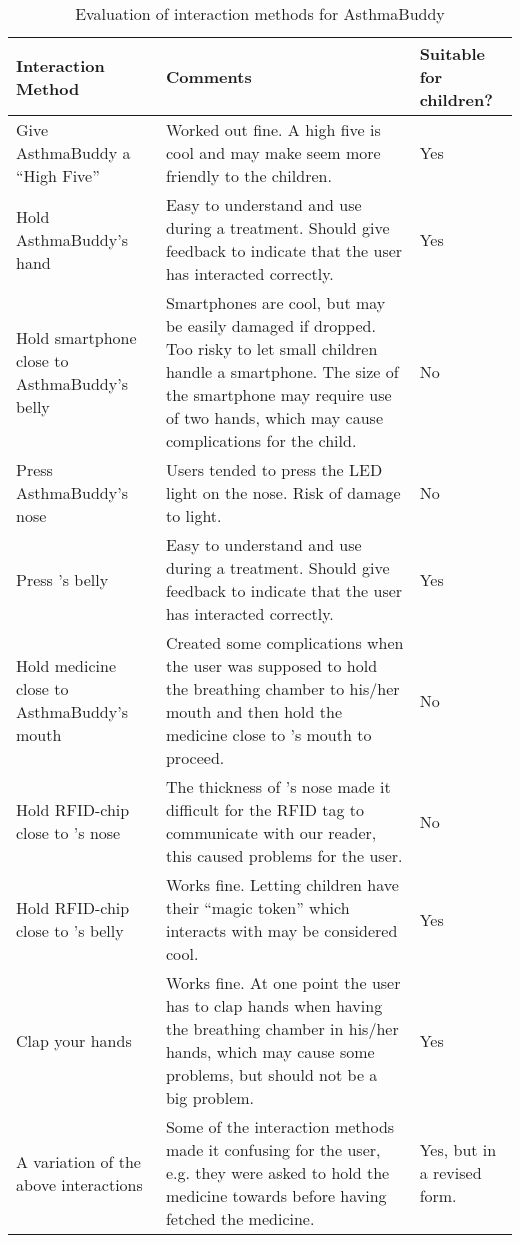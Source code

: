 \begin{singlespacing}
\begin{table}[H]
\centering
\begin{tabular}{|p{3.5cm} | p{7.6cm} | p{2.2cm} |}
\hline 
\textbf{Interaction Method} & \textbf{Comments} & \textbf{Suitable for children?}\\
\hline
	Give AsthmaBuddy a ``High Five'' & Worked out fine. A high five is cool and may make \ab{} seem more friendly to the children. & Yes \\
\hline
	Hold AsthmaBuddy's hand & Easy to understand and use during a treatment. Should give feedback to indicate that the user has interacted correctly. & Yes\\
\hline
	Hold smartphone close to AsthmaBuddy's belly & Smartphones are cool, but may be easily damaged if dropped. Too risky to let small children handle a smartphone. The size of the smartphone may require use of two hands, which may cause complications for the child. & No \\
\hline
	Press AsthmaBuddy's nose & Users tended to press the LED light on the nose. Risk of damage to light. & No\\
\hline
	Press \buddy{}'s belly & Easy to understand and use during a treatment. Should give feedback to indicate that the user has interacted correctly. & Yes\\
\hline
	Hold medicine close to AsthmaBuddy's mouth & Created some complications when the user was supposed to hold the breathing chamber to his/her mouth and then hold the medicine close to \ab{}'s mouth to proceed. & No \\
\hline
	Hold RFID-chip close to \buddy{}'s nose & The thickness of \buddy{}'s nose made it difficult for the RFID tag to communicate with our reader, this caused problems for the user. & No \\
\hline
	Hold RFID-chip close to \buddy{}'s belly & Works fine. Letting children have their ``magic token'' which interacts with \ab{} may be considered cool. & Yes\\
\hline
	Clap your hands & Works fine. At one point the user has to clap hands when having the breathing chamber in his/her hands, which may cause some problems, but should not be a big problem. & Yes\\
\hline
	A variation of the above interactions & Some of the interaction methods made it confusing for the user, e.g. they were asked to hold the medicine towards \ab{} before having fetched the medicine. & Yes, but in a revised form.\\
\hline
\end{tabular}
\caption{Evaluation of interaction methods for AsthmaBuddy}
\label{tab:interactioneval}
\end{table}
\end{singlespacing}


